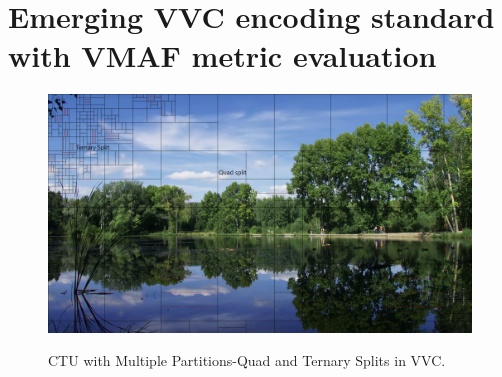 \documentclass{book}
\begin{document}
%
%
\chapter{ Emerging VVC encoding standard with VMAF metric evaluation}


\begin{figure}[hbt!]
	\centering
	{\includegraphics[width=\columnwidth]{pictures/ch7/VVC_Low_Delay_Parkrun_CTB.png}
		\label{fig:VVC_CTU}}
	\caption{CTU with Multiple Partitions-Quad and Ternary Splits in VVC.}
\end{figure}
\end{document}

